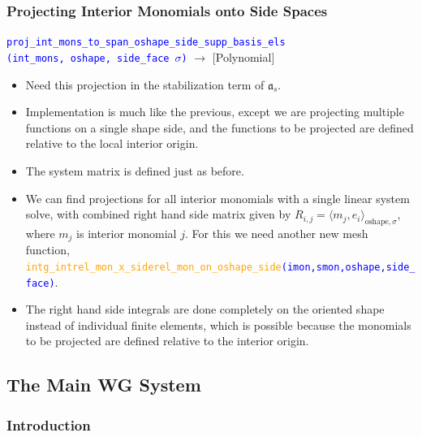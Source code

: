 \documentclass[compress]{beamer}
\begin{document}
\begin{frame}
  \frametitle{Projecting Interior Monomials onto Side Spaces}
  {\small \texttt{\textcolor{blue}{proj\_int\_mons\_to\_span\_oshape\_side\_supp\_basis\_els\\
    \hspace{0.5cm}(int\_mons, oshape, side\_face $\sigma$)}}} $\rightarrow$ [Polynomial]\\
  \pause
  \begin{itemize}[<+->]
    \item Need this projection in the stabilization term of $\mathfrak a_s$.
    \item Implementation is much like the previous, except we are projecting multiple functions on a single
      shape side, and the functions to be projected are defined relative to the local interior origin.
    \item The system matrix is defined just as before.
    \item We can find projections for all interior monomials with a single linear system solve, with combined right hand side
      matrix given by $R_{i,j} = \langle m_j, e_i\rangle_{\text{oshape},\sigma}$, where $m_j$ is interior monomial $j$. For this we
      need another new mesh function,
      \texttt{\scriptsize \textcolor{blue}{\textcolor{orange}{intg\_intrel\_mon\_x\_siderel\_mon\_on\_oshape\_side}(imon,smon,oshape,side\_face)}}.
    \item The right hand side integrals are done completely on the oriented shape instead of individual finite elements, which is
      possible because the monomials to be projected are defined relative to the interior origin.
  \end{itemize} 
\end{frame}

\subsection{The Main WG System}

\subsubsection{Introduction}
\end{document}
